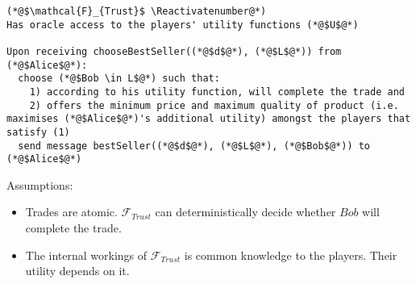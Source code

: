 \Suppressnumber
\begin{lstlisting}[label=trustfunc, style=numbers]
(*@$\mathcal{F}_{Trust}$ \Reactivatenumber@*)
Has oracle access to the players' utility functions (*@$U$@*)

Upon receiving chooseBestSeller((*@$d$@*), (*@$L$@*)) from (*@$Alice$@*):
  choose (*@$Bob \in L$@*) such that:
    1) according to his utility function, will complete the trade and
    2) offers the minimum price and maximum quality of product (i.e. maximises (*@$Alice$@*)'s additional utility) amongst the players that satisfy (1)
  send message bestSeller((*@$d$@*), (*@$L$@*), (*@$Bob$@*)) to (*@$Alice$@*)
\end{lstlisting}

Assumptions:
\begin{itemize}
  \item Trades are atomic. $\mathcal{F}_{Trust}$ can deterministically decide whether
  $Bob$ will complete the trade.
  \item The internal workings of $\mathcal{F}_{Trust}$ is common knowledge to the players.
  Their utility depends on it.
\end{itemize}

